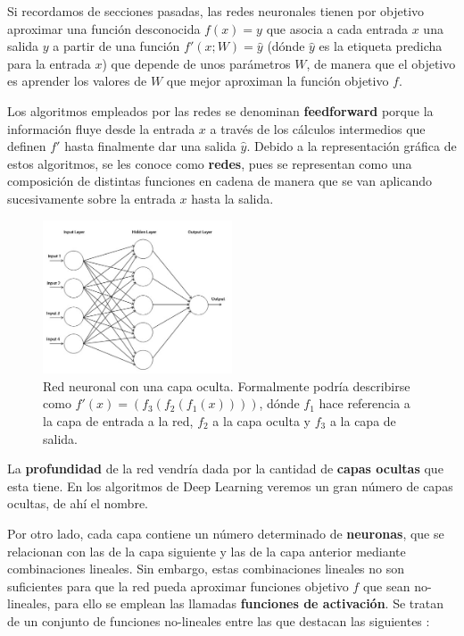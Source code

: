         \medskip

        \noindent Si recordamos de secciones pasadas, las redes neuronales tienen por objetivo aproximar una función desconocida $f(x)=y$ que asocia a cada entrada $x$ una salida $y$ a partir de una función $f'(x;W)= \widehat{y}$ (dónde $\widehat{y}$ es la etiqueta predicha para la entrada $x$) que depende de unos parámetros $W$, de manera que el objetivo es aprender los valores de $W$ que mejor aproximan la función objetivo $f$.

        \medskip

        \noindent Los algoritmos empleados por las redes se denominan \textbf{feedforward} porque la información fluye desde la entrada $x$ a través de los cálculos intermedios que definen $f'$ hasta finalmente dar una salida $\widehat{y}$. Debido a la representación gráfica de estos algoritmos, se les conoce como \textbf{redes}, pues se representan como una composición de distintas funciones en cadena de manera que se van aplicando sucesivamente sobre la entrada $x$ hasta la salida.

        \begin{figure}[!h]
            \centering
            \includegraphics[width=0.5\textwidth]{img/single_hidden_layer.jpg}
            \caption{Red neuronal con una capa oculta. Formalmente podría describirse como $f'(x)=(f_3(f_2(f_1(x))))$, dónde $f_1$ hace referencia a la capa de entrada a la red, $f_2$ a la capa oculta y $f_3$ a la capa de salida.}
            \label{fig:red_neuronal_capa_oculta}
          \end{figure}

        \noindent La \textbf{profundidad} de la red vendría dada por la cantidad de \textbf{capas ocultas} que esta tiene. En los algoritmos de Deep Learning veremos un gran número de capas ocultas, de ahí el nombre. 

        \medskip

        \noindent Por otro lado, cada capa contiene un número determinado de \textbf{neuronas}, que se relacionan con las de la capa siguiente y las de la capa anterior mediante combinaciones lineales. Sin embargo, estas combinaciones lineales no son suficientes para que la red pueda aproximar funciones objetivo $f$ que sean no-lineales, para ello se emplean las llamadas \textbf{funciones de activación}. Se tratan de un conjunto de funciones no-lineales entre las que destacan las siguientes \cite{sharma2017activation}: 

